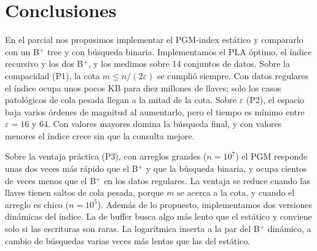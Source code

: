 \section{Conclusiones}
\label{sec:conclusiones}

En el parcial nos propusimos implementar el PGM-index estático y compararlo con un B$^+$ tree y
con búsqueda binaria. Implementamos el PLA óptimo, el índice recursivo y los dos B$^+$, y los
medimos sobre 14 conjuntos de datos. Sobre la compacidad (P1), la cota $m\le n/(2\varepsilon)$ se
cumplió siempre. Con datos regulares el índice ocupa unos pocos KB para diez millones de llaves;
solo los casos patológicos de cola pesada llegan a la mitad de la cota. Sobre $\varepsilon$ (P2),
el espacio baja varios órdenes de magnitud al aumentarlo, pero el tiempo es mínimo entre
$\varepsilon=16$ y 64. Con valores mayores domina la búsqueda final, y con valores menores el
índice crece sin que la consulta mejore.

Sobre la ventaja práctica (P3), con arreglos grandes ($n=10^7$) el PGM responde unas dos veces
más rápido que el B$^+$ y que la búsqueda binaria, y ocupa cientos de veces menos que el B$^+$ en
los datos regulares. La ventaja se reduce cuando las llaves tienen saltos de cola pesada, porque
$m$ se acerca a la cota, y cuando el arreglo es chico ($n=10^5$). Además de lo
propuesto, implementamos dos versiones dinámicas del índice. La de buffer busca algo más lento
que el estático y conviene solo si las escrituras son raras. La logarítmica inserta a la par del
B$^+$ dinámico, a cambio de búsquedas varias veces más lentas que las del estático.
